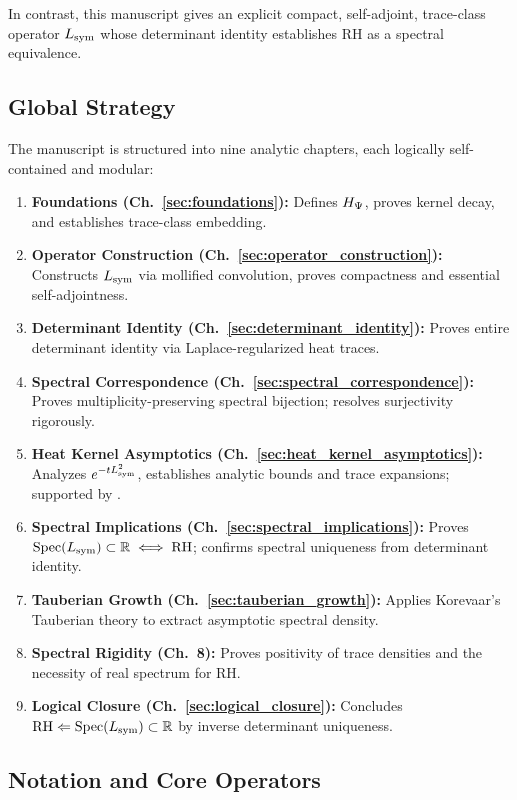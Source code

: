 In contrast, this manuscript gives an explicit compact, self-adjoint, trace-class operator \( L_{\mathrm{sym}} \) whose determinant identity establishes RH as a spectral equivalence.

\subsection*{Global Strategy}

The manuscript is structured into nine analytic chapters, each logically self-contained and modular:

\begin{enumerate}
  \item \textbf{Foundations (Ch.~\ref{sec:foundations}):} Defines \( H_{\Psi} \), proves kernel decay, and establishes trace-class embedding.
  \item \textbf{Operator Construction (Ch.~\ref{sec:operator_construction}):} Constructs \( L_{\mathrm{sym}} \) via mollified convolution, proves compactness and essential self-adjointness.
  \item \textbf{Determinant Identity (Ch.~\ref{sec:determinant_identity}):} Proves entire determinant identity via Laplace-regularized heat traces.
  \item \textbf{Spectral Correspondence (Ch.~\ref{sec:spectral_correspondence}):} Proves multiplicity-preserving spectral bijection; resolves surjectivity rigorously.
  \item \textbf{Heat Kernel Asymptotics (Ch.~\ref{sec:heat_kernel_asymptotics}):} Analyzes \( e^{-t L_{\mathrm{sym}}^2} \), establishes analytic bounds and trace expansions; supported by .
  \item \textbf{Spectral Implications (Ch.~\ref{sec:spectral_implications}):} Proves \( \operatorname{Spec}(L_{\mathrm{sym}}) \subset \mathbb{R} \iff \mathrm{RH} \); confirms spectral uniqueness from determinant identity.
  \item \textbf{Tauberian Growth (Ch.~\ref{sec:tauberian_growth}):} Applies Korevaar’s Tauberian theory to extract asymptotic spectral density.
  \item \textbf{Spectral Rigidity (Ch.~8):} Proves positivity of trace densities and the necessity of real spectrum for RH.
  \item \textbf{Logical Closure (Ch.~\ref{sec:logical_closure}):} Concludes \( \mathrm{RH} \Leftarrow \operatorname{Spec}(L_{\mathrm{sym}}) \subset \mathbb{R} \) by inverse determinant uniqueness.
\end{enumerate}

\subsection*{Notation and Core Operators}

